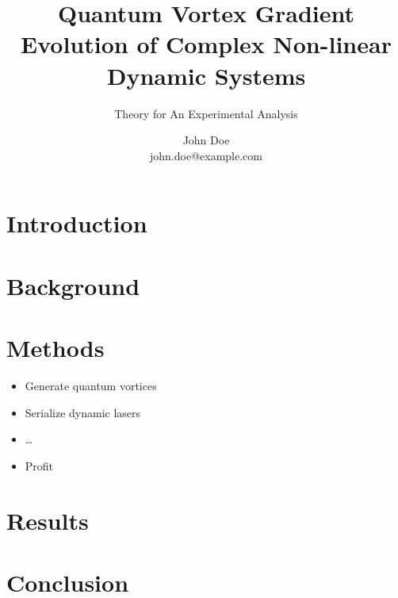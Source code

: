 \documentclass[11pt,twocolumn, toc]{paperenhanced}
\title{
    Quantum Vortex Gradient Evolution of Complex Non-linear
    Dynamic Systems
}
\subtitle{
    Theory for An Experimental Analysis
}
\author{
    John Doe \\ john.doe@example.com
}
\begin{document}
    \maketitle
    \makefrontmatter


    \section{Introduction}
    \lipsum[2]


    \section{Background}
    \lipsum[3]


    \section{Methods}
    \lipsum[4]
    \begin{itemize}
        \item {} Generate quantum vortices
        \item {} Serialize dynamic lasers
        \item {} \ldots
        \item {} Profit
    \end{itemize}


    \section{Results}
    \lipsum[5]

    \section{Conclusion}
    \lipsum[6]

    \nocite{*}
    \printbibliography
\end{document}
